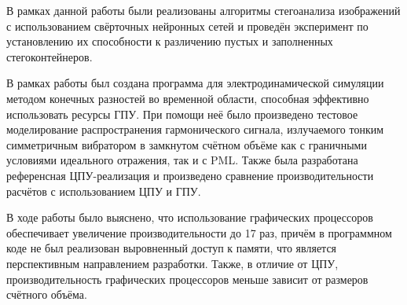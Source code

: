 

В рамках данной работы были реализованы алгоритмы стегоанализа изображений с использованием свёрточных нейронных сетей и проведён эксперимент по установлению их способности к различению пустых и заполненных стегоконтейнеров.

В рамках работы был создана программа для электродинамической симуляции методом конечных разностей во временной области,
способная эффективно использовать ресурсы ГПУ. При помощи неё было произведено тестовое моделирование распространения гармонического 
сигнала, излучаемого тонким симметричным вибратором в замкнутом счётном объёме как с граничными условиями идеального отражения, так и с PML. 
Также была разработана референсная ЦПУ-реализация и произведено сравнение 
производительности расчётов с использованием ЦПУ и ГПУ.

В ходе работы было выяснено, что использование графических процессоров 
обеспечивает увеличение производительности до 17 раз, причём в программном коде
не был реализован выровненный доступ к памяти, что является 
перспективным направлением разработки. Также, в отличие от ЦПУ, 
производительность графических процессоров меньше зависит от размеров счётного объёма.

\clearpage
